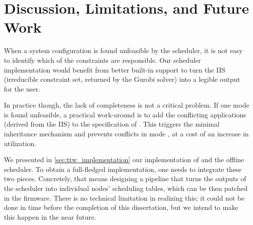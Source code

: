 \section{Discussion, Limitations, and Future Work}

When a system configuration is found unfeasible by the \TTW scheduler, it is not easy to identify which of the constraints are responsible. Our scheduler implementation would benefit from better built-in support to turn the IIS (irreducible constraint set, returned by the Gurobi solver) into a legible output for the user.

\squarepar{%
  \fakepar{The multi-mode scheduling strategy is not complete}
  Even with our minimal inheritance approach~(\cref{sec:multi_mode}), the \TTW scheduler may find a problem unfeasible even though a solution exists.
  This is due to the sequential synthesis of schedules, which is a generally under-defined problem: the choices made when synthesizing a mode's schedule may make lower-priority modes unfeasible.
  Completeness (the guarantee to find a solution if one exists) can be obtained by synthesizing all schedules within a single MILP formulation; however, the complexity scales exponentially with the number of variables~\cite{jeffay1991nonpreemptive}, which limits the practicality of this ``one-shot'' approach.
  Another alternative would be to leverage the IIS information to iterate on previously scheduled modes.
  This is not trivial and, in particular, the scheduler must be careful not to search forever
  shall the system configuration would be truly unfeasible.%
}

In practice though, the lack of completeness is not a critical problem. If one mode \modeany is found unfeasible, a practical work-around is to add the conflicting applications (derived from the IIS) to the specification of \modeany.
This triggers the minimal inheritance mechanism and prevents conflicts in mode \mode, at a cost of an increase in utilization.

We presented in \cref{sec:ttw_implementation} our implementation of \TTnet and the offline \TTW scheduler.
To obtain a full-fledged \TTW implementation, one needs to integrate these two pieces. Concretely, that means designing a pipeline that turns the outputs of the \TTW scheduler into individual nodes' scheduling tables, which can be then patched in the \TTnet firmware.
There is no technical limitation in realizing this; it could not be done in time before the completion of this dissertation, but we intend to make this happen in the near future.

